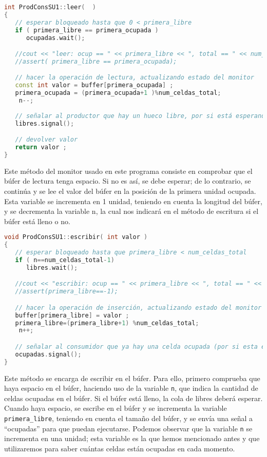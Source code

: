 \documentclass{article}
\begin{document}
\begin{lstlisting}[language=C++,caption=Función leer productor consumidor ] 
int ProdConsSU1::leer(  )
{
   // esperar bloqueado hasta que 0 < primera_libre
   if ( primera_libre == primera_ocupada )
      ocupadas.wait();

   //cout << "leer: ocup == " << primera_libre << ", total == " << num_celdas_total << endl ;
   //assert( primera_libre == primera_ocupada);

   // hacer la operación de lectura, actualizando estado del monitor
   const int valor = buffer[primera_ocupada] ;
   primera_ocupada = (primera_ocupada+1 )%num_celdas_total;
	n--;
   
   // señalar al productor que hay un hueco libre, por si está esperando
   libres.signal();

   // devolver valor
   return valor ;
}
\end{lstlisting}
Este método del monitor usado en este programa consiste en comprobar que el búfer de lectura tenga espacio. Si no es así, se debe esperar; de lo contrario, se continúa y se lee el valor del búfer en la posición de la primera unidad ocupada. Esta variable se incrementa en 1 unidad, teniendo en cuenta la longitud del búfer, y se decrementa la variable n, la cual nos indicará en el método de escritura si el búfer está lleno o no.
\begin{lstlisting}[language=C++,caption=Función escribir productor consumidor ] 
void ProdConsSU1::escribir( int valor )
{
   // esperar bloqueado hasta que primera_libre < num_celdas_total
   if ( n==num_celdas_total-1)
      libres.wait();

   //cout << "escribir: ocup == " << primera_libre << ", total == " << num_celdas_total << endl ;
   //assert(primera_libre==-1);

   // hacer la operación de inserción, actualizando estado del monitor
   buffer[primera_libre] = valor ;
   primera_libre=(primera_libre+1) %num_celdas_total;
	n++;

   // señalar al consumidor que ya hay una celda ocupada (por si esta esperando)
   ocupadas.signal();
}

\end{lstlisting}

Este método se encarga de escribir en el búfer. Para ello, primero comprueba que haya espacio en el búfer, haciendo uso de la variable \texttt{n}, que indica la cantidad de celdas ocupadas en el búfer. Si el búfer está lleno, la cola de libres deberá esperar. Cuando haya espacio, se escribe en el búfer y se incrementa la variable \texttt{primera\_libre}, teniendo en cuenta el tamaño del búfer, y se envía una señal a ``ocupadas'' para que puedan ejecutarse. Podemos observar que la variable \texttt{n} se incrementa en una unidad; esta variable es la que hemos mencionado antes y que utilizaremos para saber cuántas celdas están ocupadas en cada momento.
\end{document}
